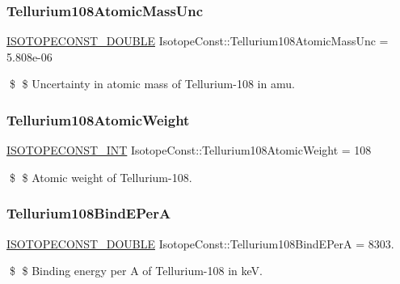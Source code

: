 \subsubsection{\texorpdfstring{Tellurium108\+Atomic\+Mass\+Unc}{Tellurium108AtomicMassUnc}}
{\footnotesize\ttfamily \mbox{\hyperlink{group___isotope_const-_macros_ga8f45a7272ce02c0b4c65c44636ed719a}{I\+S\+O\+T\+O\+P\+E\+C\+O\+N\+S\+T\+\_\+\+D\+O\+U\+B\+LE}} Isotope\+Const\+::\+Tellurium108\+Atomic\+Mass\+Unc = 5.\+808e-\/06}

\$ \$ Uncertainty in atomic mass of Tellurium-\/108 in amu. \mbox{\label{group___isotope_const-_tellurium-_te108_ga0b0342b6f83d4c37abc384e049827da2}} 
\subsubsection{\texorpdfstring{Tellurium108\+Atomic\+Weight}{Tellurium108AtomicWeight}}
{\footnotesize\ttfamily \mbox{\hyperlink{group___isotope_const-_macros_ga5f18360b3e99483a35c32d789e62621c}{I\+S\+O\+T\+O\+P\+E\+C\+O\+N\+S\+T\+\_\+\+I\+NT}} Isotope\+Const\+::\+Tellurium108\+Atomic\+Weight = 108}

\$ \$ Atomic weight of Tellurium-\/108. \mbox{\label{group___isotope_const-_tellurium-_te108_ga8704f8e555fdd22dfd1410c8a173a4a3}} 
\subsubsection{\texorpdfstring{Tellurium108\+Bind\+E\+PerA}{Tellurium108BindEPerA}}
{\footnotesize\ttfamily \mbox{\hyperlink{group___isotope_const-_macros_ga8f45a7272ce02c0b4c65c44636ed719a}{I\+S\+O\+T\+O\+P\+E\+C\+O\+N\+S\+T\+\_\+\+D\+O\+U\+B\+LE}} Isotope\+Const\+::\+Tellurium108\+Bind\+E\+PerA = 8303.}

\$ \$ Binding energy per A of Tellurium-\/108 in keV. \mbox{\label{group___isotope_const-_tellurium-_te108_gae9ef3e3796a9051dcb9913bd823df4d0}} 
